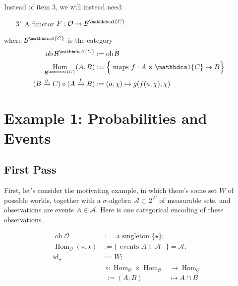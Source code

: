 \documentclass{article}
\newcommand\confdom{\mathbdcal{C}}
\DeclareMathOperator{\ob}{\mathrm{ob}}
\DeclareMathOperator{\id}{id}
\DeclareMathOperator{\Hom}{\mathrm{Hom}}
\newcommand\A{\mathcal{A}}
\newcommand\B{\mathcal{B}}
\newcommand\Ob{\mathcal{O}}
\theoremstyle{plain}
\theoremstyle{definition}
\begin{document}
    Instead of item 3, we will instead need:
    
    \begin{enumerate}
        \item[3'.] A functor $F : \mathcal O \to \B^\confdom$. 
    \end{enumerate}
    where $\B^\confdom$ is the category 
    \begin{align*}
        \ob \B^\confdom &:= \ob \B \\
        \Hom_{\B^\confdom}(A,B) &:= \Big\{ \text{ maps } f : A \times \confdom \to B \Big\} \\
        (B\xrightarrow{g}C) \circ (A \xrightarrow{f} B) 
            &:= (a, \chi) \mapsto g(f(a,\chi),\chi)
    \end{align*}
        
    
    \section{Example 1: Probabilities and Events}
    
    \subsection{First Pass}
    First, let's consider the motivating example, in which there's some set $W$ of possible worlds, together with a $\sigma$-algebra $\mathcal A \subset 2^W$ of measurable sets, and observations are events $A \in \mathcal A$. 
    Here is one categorical encoding of these observations. 
    
    \begin{align*}
        \ob \Ob &:= \text{ a singleton } \{\star\}; \\
        \Hom_{\Ob}(\star,\star) &:= 
            \{ \text{ events $A \in \A$ } \} = \A; \\
        \id_{\star} &:= W; \\
        &\begin{aligned}
        \circ : \Hom_{\Ob} \times \Hom_{\Ob} &\to \Hom_{\Ob} \\
            := (A, B) &\mapsto A \cap B
        \end{aligned}
    \end{align*}
    
\end{document}
